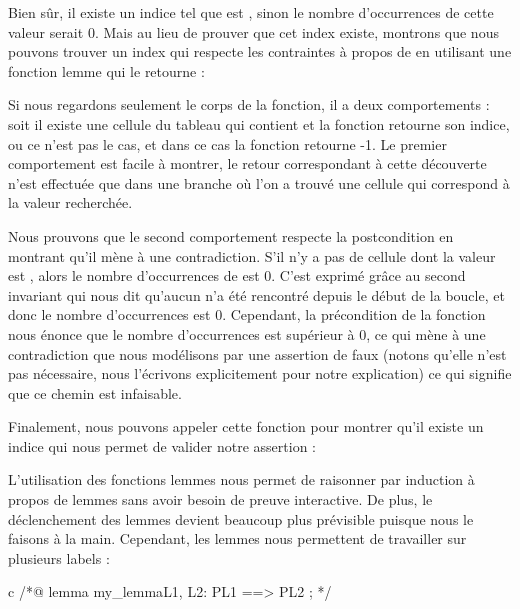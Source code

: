 

Bien sûr, il existe un indice  tel que  est
, sinon le nombre d'occurrences de cette valeur serait $0$.
Mais au lieu de prouver que cet index existe, montrons que nous pouvons trouver
un index qui respecte les contraintes à propos de  en utilisant
une fonction lemme qui le retourne :




Si nous regardons seulement le corps de la fonction, il a deux comportements :
soit il existe une cellule du tableau qui contient  et la fonction
retourne son indice, ou ce n'est pas le cas, et dans ce cas la fonction retourne
-1. Le premier comportement est facile à montrer, le retour correspondant à cette
découverte n'est effectuée que dans une branche où l'on a trouvé une cellule qui
correspond à la valeur recherchée.


Nous prouvons que le second comportement respecte la postcondition en montrant
qu'il mène à une contradiction. S'il n'y a pas de cellule dont la valeur est
, alors le nombre d'occurrences de  est 0. C'est
exprimé grâce au second invariant qui nous dit qu'aucun  n'a été
rencontré depuis le début de la boucle, et donc le nombre d'occurrences est 0.
Cependant, la précondition de la fonction nous énonce que le nombre d'occurrences
est supérieur à 0, ce qui mène à une contradiction que nous modélisons par une
assertion de faux (notons qu'elle n'est pas nécessaire, nous l'écrivons
explicitement pour notre explication) ce qui signifie que ce chemin est
infaisable.


Finalement, nous pouvons appeler cette fonction pour montrer qu'il existe un
indice qui nous permet de valider notre assertion :




L'utilisation des fonctions lemmes nous permet de raisonner par
induction à propos de lemmes sans avoir besoin de preuve interactive. De plus,
le déclenchement des lemmes devient beaucoup plus prévisible puisque nous le
faisons à la main. Cependant, les lemmes nous permettent de travailler sur
plusieurs labels :



\begin{CodeBlock}{c}
/*@
  lemma my_lemma{L1, L2}:  P{L1} ==> P{L2} ;
*/
\end{CodeBlock}


